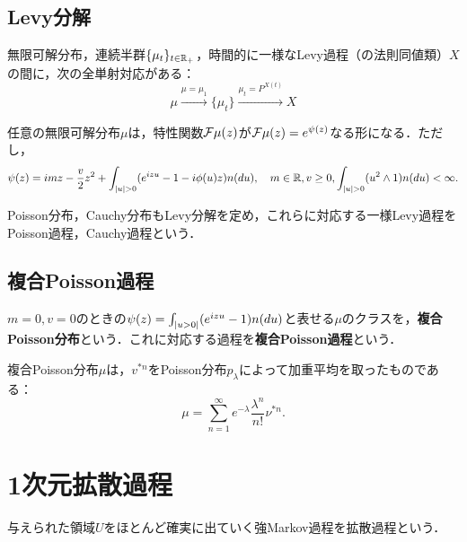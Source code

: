 \documentclass[uplatex,dvipdfmx]{jsreport}
\begin{document}
\subsection{Levy分解}

\begin{tcolorbox}[colframe=ForestGreen, colback=ForestGreen!10!white,breakable,colbacktitle=ForestGreen!40!white,coltitle=black,fonttitle=\bfseries\sffamily,
title=]
    無限可解分布，連続半群$\{\mu_t\}_{t\in\mathbb{R}_+}$，時間的に一様なLevy過程（の法則同値類）$X$の間に，次の全単射対応がある：
    \[\mu\xrightarrow{\mu=\mu_1}\{\mu_t\}\xrightarrow{\mu_t=P^{X(t)}}X\]
\end{tcolorbox}

\begin{theorem}[無限可解分布のLevy分解定理]
    任意の無限可解分布$\mu$は，特性関数$\mathcal{F}\mu(z)$が$\mathcal{F}\mu(z)=e^{\psi(z)}$なる形になる．ただし，
    \[\psi(z)=imz-\frac{v}{2}z^2+\int_{\lvert u\rvert>0}(e^{izu}-1-i\phi(u)z)n(du),\quad m\in\mathbb{R},v\ge0,\int_{\lvert u\rvert>0}(u^2\land 1)n(du)<\infty.\]
\end{theorem}

\begin{definition}
    Poisson分布，Cauchy分布もLevy分解を定め，これらに対応する一様Levy過程をPoisson過程，Cauchy過程という．
\end{definition}

\subsection{複合Poisson過程}

\begin{definition}
        $m=0,v=0$のときの$\psi(z)=\int_{\lvert u>0\rvert}(e^{izu}-1)n(du)$と表せる$\mu$のクラスを，\textbf{複合Poisson分布}という．これに対応する過程を\textbf{複合Poisson過程}という．
\end{definition}

\begin{lemma}
    複合Poisson分布$\mu$は，$v^{*n}$をPoisson分布$p_\lambda$によって加重平均を取ったものである：
    \[\mu=\sum^\infty_{n=1}e^{-\lambda}\frac{\lambda^n}{n!}\nu^{*n}.\]
\end{lemma}

\section{1次元拡散過程}

\begin{tcolorbox}[colframe=ForestGreen, colback=ForestGreen!10!white,breakable,colbacktitle=ForestGreen!40!white,coltitle=black,fonttitle=\bfseries\sffamily,
title=]
    与えられた領域$U$をほとんど確実に出ていく強Markov過程を拡散過程という．
\end{tcolorbox}
\end{document}
